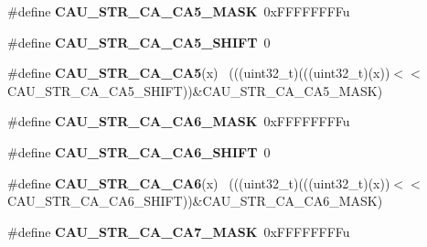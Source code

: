 \begin{DoxyCompactItemize}
\item 
\hypertarget{group___c_a_u___register___masks_ga4b0911976e175086b6459ec3d90c1653}{}\#define {\bfseries C\+A\+U\+\_\+\+S\+T\+R\+\_\+\+C\+A\+\_\+\+C\+A5\+\_\+\+M\+A\+S\+K}~0x\+F\+F\+F\+F\+F\+F\+F\+Fu\label{group___c_a_u___register___masks_ga4b0911976e175086b6459ec3d90c1653}

\item 
\hypertarget{group___c_a_u___register___masks_ga550505d55e65ebb24f8b93829fc709dc}{}\#define {\bfseries C\+A\+U\+\_\+\+S\+T\+R\+\_\+\+C\+A\+\_\+\+C\+A5\+\_\+\+S\+H\+I\+F\+T}~0\label{group___c_a_u___register___masks_ga550505d55e65ebb24f8b93829fc709dc}

\item 
\hypertarget{group___c_a_u___register___masks_ga3053b235b5a467765cfdbb40840cd63e}{}\#define {\bfseries C\+A\+U\+\_\+\+S\+T\+R\+\_\+\+C\+A\+\_\+\+C\+A5}(x)                                            ~(((uint32\+\_\+t)(((uint32\+\_\+t)(x))$<$$<$C\+A\+U\+\_\+\+S\+T\+R\+\_\+\+C\+A\+\_\+\+C\+A5\+\_\+\+S\+H\+I\+F\+T))\&C\+A\+U\+\_\+\+S\+T\+R\+\_\+\+C\+A\+\_\+\+C\+A5\+\_\+\+M\+A\+S\+K)\label{group___c_a_u___register___masks_ga3053b235b5a467765cfdbb40840cd63e}

\item 
\hypertarget{group___c_a_u___register___masks_ga7b5a1caf333ef375bf06cd83702a2f52}{}\#define {\bfseries C\+A\+U\+\_\+\+S\+T\+R\+\_\+\+C\+A\+\_\+\+C\+A6\+\_\+\+M\+A\+S\+K}~0x\+F\+F\+F\+F\+F\+F\+F\+Fu\label{group___c_a_u___register___masks_ga7b5a1caf333ef375bf06cd83702a2f52}

\item 
\hypertarget{group___c_a_u___register___masks_ga2d6d9fbc55d31a3abf405b19663984fd}{}\#define {\bfseries C\+A\+U\+\_\+\+S\+T\+R\+\_\+\+C\+A\+\_\+\+C\+A6\+\_\+\+S\+H\+I\+F\+T}~0\label{group___c_a_u___register___masks_ga2d6d9fbc55d31a3abf405b19663984fd}

\item 
\hypertarget{group___c_a_u___register___masks_ga2dbf6a013512671527934abd61a07cd7}{}\#define {\bfseries C\+A\+U\+\_\+\+S\+T\+R\+\_\+\+C\+A\+\_\+\+C\+A6}(x)                                            ~(((uint32\+\_\+t)(((uint32\+\_\+t)(x))$<$$<$C\+A\+U\+\_\+\+S\+T\+R\+\_\+\+C\+A\+\_\+\+C\+A6\+\_\+\+S\+H\+I\+F\+T))\&C\+A\+U\+\_\+\+S\+T\+R\+\_\+\+C\+A\+\_\+\+C\+A6\+\_\+\+M\+A\+S\+K)\label{group___c_a_u___register___masks_ga2dbf6a013512671527934abd61a07cd7}

\item 
\hypertarget{group___c_a_u___register___masks_ga71cb093a615f022bab07fea3386b14c4}{}\#define {\bfseries C\+A\+U\+\_\+\+S\+T\+R\+\_\+\+C\+A\+\_\+\+C\+A7\+\_\+\+M\+A\+S\+K}~0x\+F\+F\+F\+F\+F\+F\+F\+Fu\label{group___c_a_u___register___masks_ga71cb093a615f022bab07fea3386b14c4}


\end{DoxyCompactItemize}
